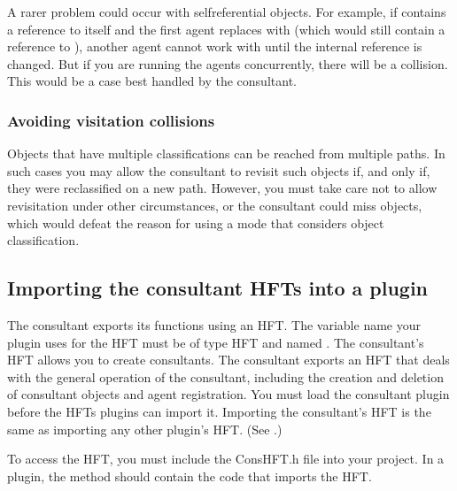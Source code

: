\documentclass[letterpaper,12pt,english,openany,oneside]{sphinxmanual}
\begin{document}
A rarer problem could occur with self\sphinxhyphen{}referential objects. For example, if  contains a reference to itself and the first agent replaces  with  (which would still contain a reference to  ), another agent cannot work with  until the internal reference is changed. But if you are running the agents concurrently, there will be a collision. This would be a case best handled by the consultant.


\subsubsection{Avoiding visitation collisions}
\label{\detokenize{Plugins_ExtendedAPI:avoiding-visitation-collisions}}
Objects that have multiple classifications can be reached from multiple paths. In such cases you may allow the consultant to revisit such objects if, and only if, they were reclassified on a new path. However, you must take care not to allow revisitation under other circumstances, or the consultant could miss objects, which would defeat the reason for using a mode that considers object classification.


\subsection{Importing the consultant HFTs into a plugin}
\label{\detokenize{Plugins_ExtendedAPI:importing-the-consultant-hfts-into-a-plugin}}
The consultant exports its functions using an HFT. The variable name your plugin uses for the HFT must be of type HFT and named . The consultant’s HFT allows you to create consultants. The consultant exports an HFT that deals with the general operation of the consultant, including the creation and deletion of consultant objects and agent registration. You must load the consultant plugin before the HFTs plugins can import it. Importing the consultant’s HFT is the same as importing any other plugin’s HFT. (See .)

To access the HFT, you must include the ConsHFT.h file into your project. In a plugin, the  method should contain the code that imports the HFT.
\end{document}
